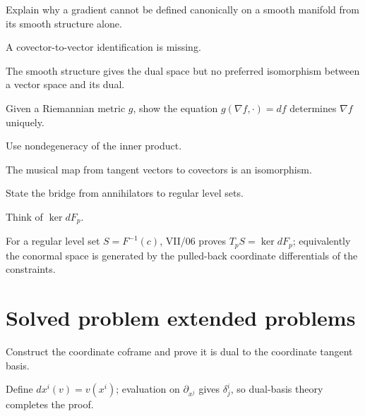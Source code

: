 \begin{exercise}\label{exr:vii05-22}
Explain why a gradient cannot be defined canonically on a smooth manifold from its smooth structure alone.
\end{exercise}
\begin{hint}
A covector-to-vector identification is missing.
\end{hint}
\begin{solution}
The smooth structure gives the dual space but no preferred isomorphism between a vector space and its dual.
\end{solution}

\begin{exercise}\label{exr:vii05-23}
Given a Riemannian metric \(g\), show the equation \(g(\nabla f,\cdot)=df\) determines \(\nabla f\) uniquely.
\end{exercise}
\begin{hint}
Use nondegeneracy of the inner product.
\end{hint}
\begin{solution}
The musical map from tangent vectors to covectors is an isomorphism.
\end{solution}

\begin{exercise}\label{exr:vii05-24}
State the bridge from annihilators to regular level sets.
\end{exercise}
\begin{hint}
Think of \(\ker dF_p\).
\end{hint}
\begin{solution}
For a regular level set \(S=F^{-1}(c)\), VII/06 proves \(T_pS=\ker dF_p\); equivalently the conormal space is generated by the pulled-back coordinate differentials of the constraints.
\end{solution}


\section{Solved problem extended problems}
\begin{problem}\label{prob:vii05-01}
Construct the coordinate coframe and prove it is dual to the coordinate tangent basis.
\end{problem}
\begin{solution}
Define \(dx^i(v)=v(x^i)\); evaluation on \(\partial_{x^j}\) gives \(\delta^i_j\), so dual-basis theory completes the proof.
\end{solution}

